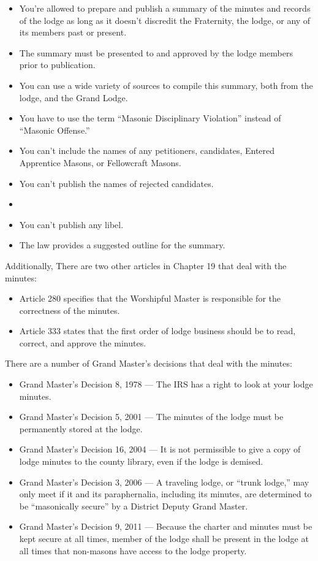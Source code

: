\documentclass{article}
\newcommand{\gmd}[2]{
	Grand Master's Decision \textnumero{} #1, #2
}
\begin{document}
	\begin{itemize}
		\item You're allowed to prepare and publish a summary of the minutes and records of the lodge as long as it doesn't discredit the Fraternity, the lodge, or any of its members past or present.
		\item The summary must be presented to and approved by the lodge members prior to publication.
		\item You can use a wide variety of sources to compile this summary, both from the lodge, and the Grand Lodge.
		\item You have to use the term ``Masonic Disciplinary Violation'' instead of ``Masonic Offense.''
		\item You can't include the names of any petitioners, candidates, Entered 	Apprentice Masons, or Fellowcraft Masons.
		\item You can't publish the names of rejected candidates.
		\item 
		\item You can't publish any libel.
		\item The law provides a suggested outline for the summary.
	\end{itemize}

	Additionally, There are two other articles in Chapter 19 that deal with the minutes:
	
	\begin{itemize}
		\item Article 280 specifies that the Worshipful Master is responsible for the correctness of the minutes.
		\item Article 333 states that the first order of lodge business should be to read, correct, and approve the minutes.
	\end{itemize}
	
	There are a number of Grand Master's decisions that deal with the minutes:
	
	\begin{itemize}
		\item \gmd{8}{1978} --- The IRS has a right to look at your lodge minutes.
		\item \gmd{5}{2001} --- The minutes of the lodge must be permanently stored at the lodge.
		\item \gmd{16}{2004} --- It is not permissible to give a copy of lodge minutes to the county library, even if the lodge is demised.	
		\item \gmd{3}{2006} --- A traveling lodge, or ``trunk lodge,'' may only meet if it and its paraphernalia, including its minutes, are determined to be ``masonically secure'' by a District Deputy Grand Master.
		\item \gmd{9}{2011} --- Because the charter and minutes must be kept secure at all times, member of the lodge shall be present in the lodge at all times that non-masons have access to the lodge property.
	\end{itemize}
	
	
\end{document}
